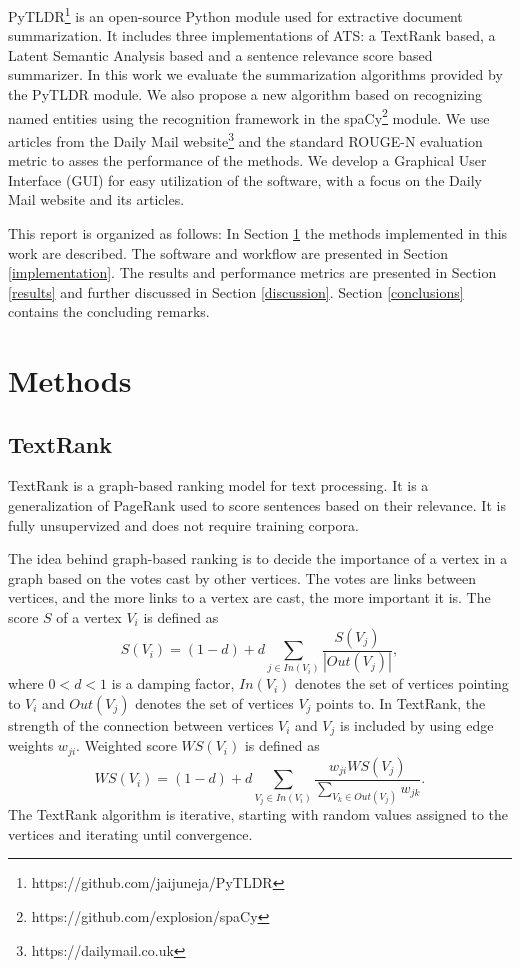 \documentclass[conference]{IEEEtran}
\begin{document}
PyTLDR\footnote{https://github.com/jaijuneja/PyTLDR} is an open-source Python module used for extractive document summarization. It includes three implementations of ATS: a TextRank based, a Latent Semantic Analysis based and a sentence relevance score based summarizer. In this work we evaluate the summarization algorithms provided by the PyTLDR module. We also propose a new algorithm based on recognizing named entities using the recognition framework in the spaCy\footnote{https://github.com/explosion/spaCy} module.
We use articles from the Daily Mail website\footnote{https://dailymail.co.uk} and the standard ROUGE-N evaluation metric to asses the performance of the methods. 
We develop a Graphical User Interface (GUI) for easy utilization of the software, with a focus on the Daily Mail website and its articles.

This report is organized as follows: In Section \ref{background} the methods implemented in this work are described. 
The software and workflow are presented in Section \ref{implementation}. The results and performance metrics are presented in Section \ref{results} and further discussed in Section \ref{discussion}. Section \ref{conclusions} contains the concluding remarks.

\section{Methods}\label{background}
\subsection{TextRank}
TextRank \cite{mihalcea2004} is a graph-based ranking model for text processing. It is a generalization of PageRank used to score sentences based on their relevance. It is fully unsupervized and does not require training corpora. 

The idea behind graph-based ranking is to decide the importance of a vertex in a graph based on the votes cast by other vertices. The votes are links between vertices, and the more links to a vertex are cast, the more important it is. The score $S$ of a vertex $V_i$ is defined as \cite{brin1998}
\begin{equation}
S(V_i) = (1-d)+d \sum \limits_{j \in In(V_i)} \frac{S(V_j)}{|Out(V_j)|},
\end{equation}
where $0 < d < 1$ is a damping factor, $In(V_i)$ denotes the set of vertices pointing to $V_i$ and $Out(V_j)$ denotes the set of vertices $V_j$ points to. In TextRank, the strength of the connection between vertices $V_i$ and $V_j$ is included by using edge weights $w_{ji}$. Weighted score $WS(V_i)$ is defined as
\begin{equation}
WS(V_i) = (1-d) + d \sum \limits_{V_j \in In(V_i)} \frac{w_{ji} WS(V_j)}{\sum \limits_{V_k \in Out(V_j)}w_{jk}}.
\end{equation}
The TextRank algorithm is iterative, starting with random values assigned to the vertices and iterating until convergence.
\end{document}
